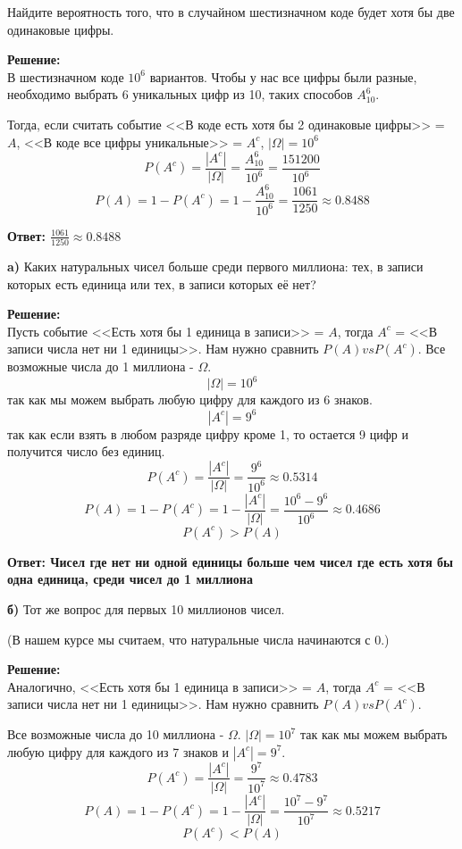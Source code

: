 \documentclass[a4paper,12pt]{article}
\newcounter{z}
\newcommand{\z}{\refstepcounter{z}\vskip 20pt\noindent
\fbox{\textbf{\arabic{z}}} }
\begin{document}
\z Найдите вероятность того, что в случайном шестизначном коде будет хотя бы две одинаковые цифры.

\textbf{Решение:}\\
В шестизначном коде $10^6$ вариантов. Чтобы у нас все цифры были разные, необходимо выбрать 6 уникальных цифр из 10, таких способов $A^6_{10}$.

Тогда, если считать событие <<В коде есть хотя бы 2 одинаковые цифры>> = $A$, <<В коде все цифры уникальные>> = $A^c$,
$|\Omega| = 10^6$
$$P(A^c) = \frac{|A^c|}{|\Omega|}=\frac{A^6_{10}}{10^6}=\frac{151200}{10^6}$$
$$P(A) = 1-P(A^c) = 1- \frac{A^6_{10}}{10^6}= \frac{1061}{1250}\approx0.8488$$



\textbf{Ответ: $\frac{1061}{1250}\approx0.8488$}

\z {\bf a)} Каких натуральных чисел больше среди первого миллиона: тех, в записи которых
есть единица или тех, в записи которых её нет?

\textbf{Решение:}\\
Пусть событие <<Есть хотя бы 1 единица в записи>> = $A$, тогда $A^c$ =  <<В записи числа нет ни 1 единицы>>. Нам нужно сравнить ${P(A)} vs {P(A^c)}$. Все возможные числа до 1 миллиона - $\Omega$.
$$|\Omega| = 10^6$$ так как мы можем выбрать любую цифру для каждого из 6 знаков.
$$|A^c| = 9^6$$ так как если взять в любом разряде цифру кроме 1, то остается 9 цифр и получится число без единиц.
$$P(A^c) = \frac{|A^c|}{|\Omega|}=\frac{9^6}{10^6}\approx0.5314$$
$$P(A) = 1-P(A^c)=1- \frac{|A^c|}{|\Omega|}=\frac{10^6-9^6}{10^6}\approx0.4686$$
$$P(A^c) > P(A)$$

\textbf{Ответ: Чисел где нет ни одной единицы больше чем чисел где есть хотя бы одна единица, среди чисел до 1 миллиона}

{\bf б)} Тот же вопрос для первых 10 миллионов чисел.

(В нашем курсе мы считаем, что натуральные числа начинаются с $0$.)

\textbf{Решение:}\\
Аналогично, <<Есть хотя бы 1 единица в записи>> = $A$, тогда $A^c$ =  <<В записи числа нет ни 1 единицы>>. Нам нужно сравнить ${P(A)} vs {P(A^c)}$. 

Все возможные числа до 10 миллиона - $\Omega$.
$|\Omega| = 10^7$ так как мы можем выбрать любую цифру для каждого из 7 знаков и $|A^c| = 9^7$.
$$P(A^c) = \frac{|A^c|}{|\Omega|}=\frac{9^7}{10^7}\approx0.4783$$
$$P(A) = 1-P(A^c)=1- \frac{|A^c|}{|\Omega|}=\frac{10^7-9^7}{10^7}\approx0.5217$$
$$P(A^c) < P(A)$$
\end{document}
